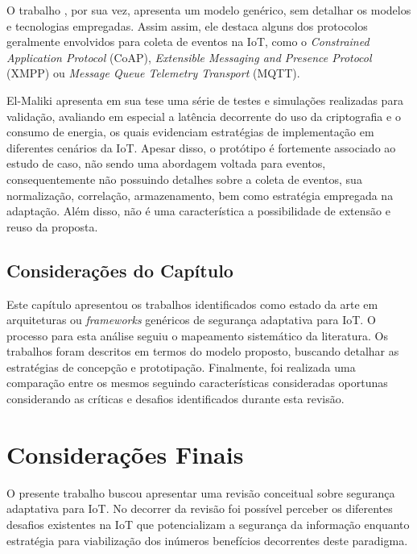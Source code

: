 \documentclass[tid,table]{texufpel} %
\begin{document}
O trabalho \cite{ramos15}, por sua vez, apresenta um modelo genérico, sem detalhar os modelos e tecnologias empregadas. Assim assim, ele destaca alguns dos protocolos geralmente envolvidos para coleta de eventos na IoT, como o \textit{Constrained Application Protocol} (CoAP), \textit{Extensible Messaging and Presence Protocol} (XMPP) ou \textit{Message Queue Telemetry Transport} (MQTT).

El-Maliki apresenta em sua tese \cite{elmaliki14} uma série de testes e simulações realizadas para validação, avaliando em especial a latência decorrente do uso da criptografia e o consumo de energia, os quais evidenciam estratégias de implementação em diferentes cenários da IoT. Apesar disso, o protótipo é fortemente associado ao estudo de caso, não sendo uma abordagem voltada para eventos, consequentemente não possuindo detalhes sobre a coleta de eventos, sua normalização, correlação, armazenamento, bem como estratégia empregada na adaptação. Além disso, não é uma característica a possibilidade de extensão e reuso da proposta.

\section{Considerações do Capítulo}

Este capítulo apresentou os trabalhos identificados como estado da arte em arquiteturas ou \textit{frameworks} genéricos de segurança adaptativa para IoT. O processo para esta análise seguiu o mapeamento sistemático da literatura. Os trabalhos foram descritos em termos do modelo proposto, buscando detalhar as estratégias de concepção e prototipação. Finalmente, foi realizada uma comparação entre os mesmos seguindo características consideradas oportunas considerando as críticas e desafios identificados durante esta revisão. 


\chapter{Considerações Finais}

O presente trabalho buscou apresentar uma revisão conceitual sobre segurança adaptativa para IoT. No decorrer da revisão foi possível perceber os diferentes desafios existentes na IoT que potencializam a segurança da informação enquanto estratégia para viabilização dos inúmeros benefícios decorrentes deste paradigma. 
\end{document}
